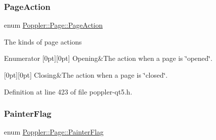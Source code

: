 \subsubsection{\texorpdfstring{Page\+Action}{PageAction}}
{\footnotesize\ttfamily enum \hyperlink{class_poppler_1_1_page_ac77a0b29e76e6ddcb6fb177ef3e3396f}{Poppler\+::\+Page\+::\+Page\+Action}}

The kinds of page actions \begin{DoxyEnumFields}{Enumerator}
[0pt][0pt]{}\mbox{\label{class_poppler_1_1_page_ac77a0b29e76e6ddcb6fb177ef3e3396faf5dcfdca988348f8e8fb7885e0cc6138}} 
Opening&The action when a page is \char`\"{}opened\char`\"{}. \\
\hline

[0pt][0pt]{}\mbox{\label{class_poppler_1_1_page_ac77a0b29e76e6ddcb6fb177ef3e3396fa60dc4631fb47a5f8bdef5c790a052f62}} 
Closing&The action when a page is \char`\"{}closed\char`\"{}. \\
\hline

\end{DoxyEnumFields}


Definition at line 423 of file poppler-\/qt5.\+h.

\mbox{\label{class_poppler_1_1_page_a7b9a4e7b8a2bb20b036e862c7409be6b}} 
\subsubsection{\texorpdfstring{Painter\+Flag}{PainterFlag}}
{\footnotesize\ttfamily enum \hyperlink{class_poppler_1_1_page_a7b9a4e7b8a2bb20b036e862c7409be6b}{Poppler\+::\+Page\+::\+Painter\+Flag}}

